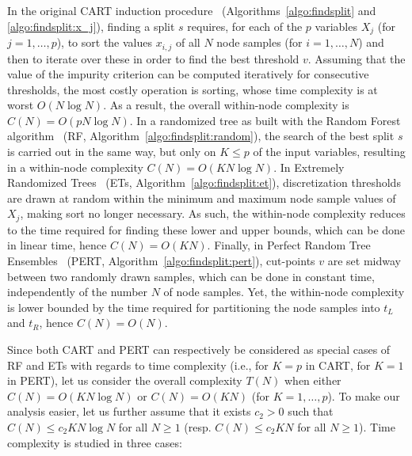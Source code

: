 In the original CART induction procedure~\citep{breiman:1984}
(Algorithms~\ref{algo:findsplit} and \ref{algo:findsplit:x_j}), finding a split
$s$  requires, for each of the $p$ variables $X_j$ (for $j=1,\dots,p$), to sort
the values $x_{i,j}$ of all $N$ node samples (for $i=1,\dots,N$) and then to
iterate over these in order to find the best threshold $v$. Assuming that the
value of the impurity criterion can be computed iteratively for consecutive
thresholds, the most costly operation
is sorting, whose time complexity is at worst $O(N \log N)$. As a result, the
overall within-node complexity is $C(N) = O(p N \log N)$. In a randomized tree
as built with the Random Forest algorithm~\citep{breiman:2001} (RF,
Algorithm~\ref{algo:findsplit:random}), the search of the best split $s$ is
carried out in the same way, but only on $K \leq p$ of the input variables,
resulting in a within-node complexity $C(N) = O(K N \log N)$. In Extremely
Randomized Trees~\citep{geurts:2006} (ETs, Algorithm~\ref{algo:findsplit:et}),
discretization thresholds are drawn at random within the minimum and maximum
node sample values of $X_j$, making sort no longer necessary. As such, the
within-node complexity reduces to the time required for finding these lower and
upper bounds, which can be done in linear time, hence $C(N)=O(KN)$. Finally, in
Perfect Random Tree Ensembles~\citep{cutler:2001} (PERT,
Algorithm~\ref{algo:findsplit:pert}), cut-points $v$ are set midway between two
randomly drawn samples, which can be done in constant time, independently of
the number $N$ of node samples. Yet, the within-node complexity is lower
bounded by the time required for partitioning the node samples into ${t_L}$ and
${t_R}$, hence $C(N)=O(N)$.

Since both CART and PERT can respectively be considered as special cases of RF
and ETs with regards to time complexity (i.e., for $K=p$ in CART, for $K=1$ in
PERT), let us consider the overall complexity $T(N)$ when either $C(N)=O(KN\log
N)$ or $C(N)=O(KN)$ (for $K=1,\dots,p$). To make our analysis easier, let us
further assume that it exists $c_2 > 0$ such that $C(N) \leq c_2 KN \log N$ for
all $N \geq 1$ (resp. $C(N) \leq c_2 KN$ for all $N \geq 1$). Time complexity
is studied in three cases:

